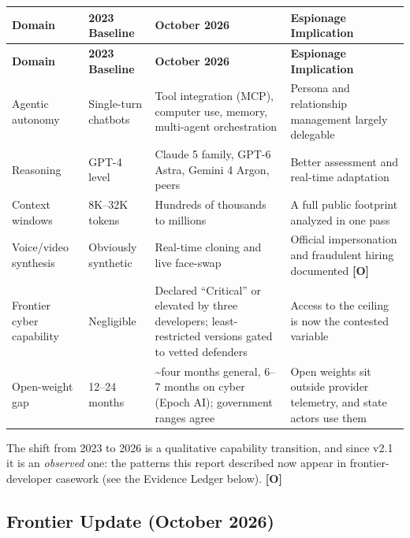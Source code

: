 \documentclass[11pt,letterpaper]{article}
\begin{document}
{\small
\begin{longtable}{L{2.6cm}L{2.6cm}L{3.7cm}L{4cm}}
\toprule
\textbf{Domain} & \textbf{2023 Baseline} & \textbf{October 2026} & \textbf{Espionage Implication} \\
\midrule
\endfirsthead
\toprule
\textbf{Domain} & \textbf{2023 Baseline} & \textbf{October 2026} & \textbf{Espionage Implication} \\
\midrule
\endhead
Agentic autonomy & Single-turn chatbots & Tool integration (MCP), computer use, memory, multi-agent orchestration & Persona and relationship management largely delegable \\*
Reasoning & GPT-4 level & Claude 5 family, GPT-6 Astra, Gemini 4 Argon, peers & Better assessment and real-time adaptation \\
Context windows & 8K--32K tokens & Hundreds of thousands to millions & A full public footprint analyzed in one pass \\
Voice/video synthesis & Obviously synthetic & Real-time cloning and live face-swap & Official impersonation and fraudulent hiring documented \textbf{[O]} \\
Frontier cyber capability & Negligible & Declared ``Critical'' or elevated by three developers; least-restricted versions gated to vetted defenders & Access to the ceiling is now the contested variable \\*
Open-weight gap & 12--24 months & \textasciitilde{}four months general, 6--7 months on cyber (Epoch AI); government ranges agree & Open weights sit outside provider telemetry, and state actors use them \\
\bottomrule
\end{longtable}}

\begin{keybox}
The shift from 2023 to 2026 is a qualitative capability transition, and since v2.1 it is an \textit{observed} one: the patterns this report described now appear in frontier-developer casework (see the Evidence Ledger below). \textbf{[O]}
\end{keybox}

\subsection{Frontier Update (October 2026)}
\end{document}
